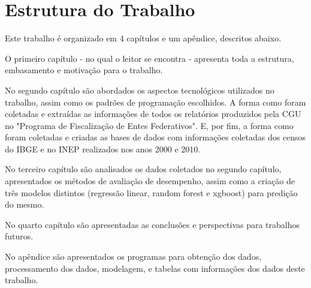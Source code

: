 \section{Estrutura do Trabalho}
\label{sec:estrutura_do_trabalho}

Este trabalho é organizado em 4 capítulos e um apêndice, descritos abaixo.

O primeiro capítulo - no qual o leitor se encontra - apresenta toda a estrutura, embasamento e motivação para o trabalho.

No segundo capítulo são abordados os aspectos tecnológicos utilizados no trabalho, assim como os padrões de programação escolhidos. A forma como foram coletadas e extraídas as informações de todos os relatórios produzidos pela CGU no "Programa de Fiscalização de Entes Federativos". E, por fim, a forma como foram coletadas e criadas as bases de dados com informações coletadas dos censos do IBGE e no INEP realizados nos anos 2000 e 2010.

No terceiro capítulo são analisados os dados coletados no segundo capítulo, apresentados os métodos de avaliação de desempenho, assim como a criação de três modelos distintos (regressão linear, random forest e xgboost) para predição do mesmo.

No quarto capítulo são apresentadas as conclusões e perspectivas para trabalhos futuros.

No apêndice são apresentados os programas para obtenção dos dados, processamento dos dados, modelagem, e tabelas com informações dos dados deste trabalho.

